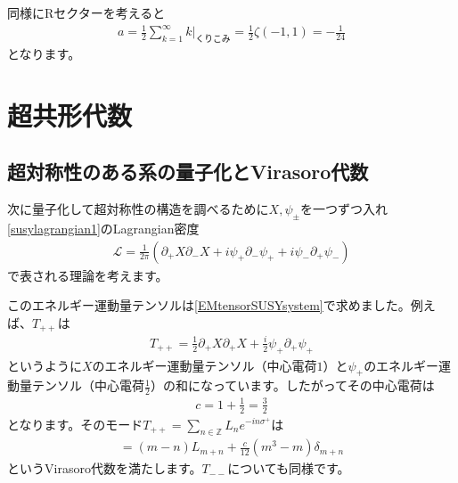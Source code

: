 \documentclass[report,paper=a4, fontsize=12pt, line_length=16cm, number_of_lines=33,dvipdfmx]{jlreq}
\numberwithin{equation}{chapter}
\numberwithin{equation}{section}
\newcommand{\Zb}{\mathbb{Z}}
\newcommand{\del}{\partial}
\newcommand{\Lcal}{\mathcal{L}}
\begin{document}
同様にRセクターを考えると
\begin{align}
  a=\frac12 \sum_{k=1}^{\infty}k\Bigg|_{\text{くりこみ}}=\frac12\zeta(-1,1)=-\frac{1}{24}
  \label{aRfermion1}
\end{align}
となります。

\section{超共形代数}
\subsection{超対称性のある系の量子化とVirasoro代数}
次に量子化して超対称性の構造を調べるために$X,\psi_{\pm}$を一つずつ入れ\eqref{susylagrangian1}のLagrangian密度
\begin{align}
  \Lcal=\frac{1}{2\pi}\left( 
    \del_{+}X\del_{-}X+i\psi_{+}\del_{-}\psi_{+}+i\psi_{-}\del_{+}\psi_{-}
   \right)
\end{align}
で表される理論を考えます。

このエネルギー運動量テンソルは\eqref{EMtensorSUSYsystem}で求めました。例えば、$T_{++}$は
\begin{align}
  T_{++}=\frac12\del_{+}X\del_{+}X+\frac{i}{2}\psi_{+}\del_{+}\psi_{+}
\end{align}
というように$X$のエネルギー運動量テンソル（中心電荷$1$）と$\psi_{+}$のエネルギー運動量テンソル（中心電荷$\frac12$）の和になっています。したがってその中心電荷は
\begin{align}
  c=1+\frac12 =\frac{3}{2}
\end{align}
となります。そのモード$T_{++}=\sum_{n\in\Zb}L_{n}e^{-in\sigma^+}$は
\begin{align}
  [L_m,L_n]=(m-n)L_{m+n}+\frac{c}{12}(m^3-m)\delta_{m+n}\label{VirasoroXpsi}
\end{align}
というVirasoro代数を満たします。$T_{--}$についても同様です。
\end{document}
